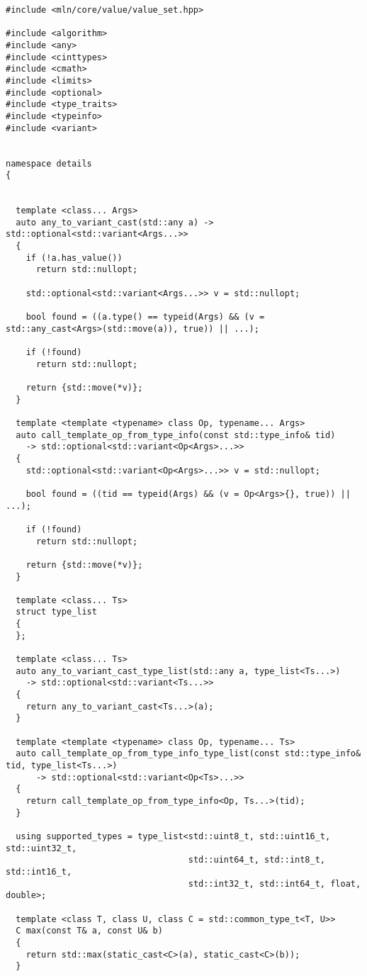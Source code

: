 \begin{verbatim}
#include <mln/core/value/value_set.hpp>

#include <algorithm>
#include <any>
#include <cinttypes>
#include <cmath>
#include <limits>
#include <optional>
#include <type_traits>
#include <typeinfo>
#include <variant>


namespace details
{


  template <class... Args>
  auto any_to_variant_cast(std::any a) -> std::optional<std::variant<Args...>>
  {
    if (!a.has_value())
      return std::nullopt;

    std::optional<std::variant<Args...>> v = std::nullopt;

    bool found = ((a.type() == typeid(Args) && (v = std::any_cast<Args>(std::move(a)), true)) || ...);

    if (!found)
      return std::nullopt;

    return {std::move(*v)};
  }

  template <template <typename> class Op, typename... Args>
  auto call_template_op_from_type_info(const std::type_info& tid)
    -> std::optional<std::variant<Op<Args>...>>
  {
    std::optional<std::variant<Op<Args>...>> v = std::nullopt;

    bool found = ((tid == typeid(Args) && (v = Op<Args>{}, true)) || ...);

    if (!found)
      return std::nullopt;

    return {std::move(*v)};
  }

  template <class... Ts>
  struct type_list
  {
  };

  template <class... Ts>
  auto any_to_variant_cast_type_list(std::any a, type_list<Ts...>)
    -> std::optional<std::variant<Ts...>>
  {
    return any_to_variant_cast<Ts...>(a);
  }

  template <template <typename> class Op, typename... Ts>
  auto call_template_op_from_type_info_type_list(const std::type_info& tid, type_list<Ts...>)
      -> std::optional<std::variant<Op<Ts>...>>
  {
    return call_template_op_from_type_info<Op, Ts...>(tid);
  }

  using supported_types = type_list<std::uint8_t, std::uint16_t, std::uint32_t,
                                    std::uint64_t, std::int8_t, std::int16_t,
                                    std::int32_t, std::int64_t, float, double>;

  template <class T, class U, class C = std::common_type_t<T, U>>
  C max(const T& a, const U& b)
  {
    return std::max(static_cast<C>(a), static_cast<C>(b));
  }


\end{verbatim}
